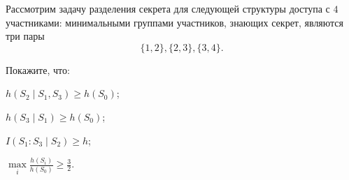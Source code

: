 Рассмотрим задачу разделения секрета для следующей структуры доступа с $4$ участниками: минимальными
группами участников, знающих секрет, являются три пары
$$
    \{1, 2\}, \{2, 3\}, \{3, 4\}.
$$

Покажите, что:
\begin{enumcyr}
    \item $h(S_2 \mid S_1, S_3) \ge h(S_0)$;
    \item $h(S_3 \mid S_1) \ge h(S_0)$;
    \item $I(S_1 : S_3 \mid S_2) \ge h$;
    \item $\max\limits_i \frac{h(S_i)}{h(S_0)} \ge \frac{3}{2}$.
\end{enumcyr}
    